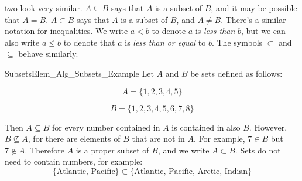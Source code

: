 \documentclass[crop=false,class=book,oneside]{standalone}
\begin{document}
            two look very similar. $A\subseteq{B}$ says that
            $A$ is a subset of $B$, and it may be possible that
            $A=B$. $A\subset{B}$ says that $A$ is a subset of $B$,
            and $A\ne{B}$.
            There's a similar notation for inequalities. We
            write $a<b$ to denote $a$ is \textit{less than} $b$,
            but we can also write $a\leq{b}$ to denote
            that $a$ is \textit{less than or equal} to $b$.
            The symbols $\subset$ and $\subseteq$
            behave similarly.
            \begin{fexample}{Subsets}{Elem_Alg_Subsets_Example}
                Let $A$ and $B$ be sets defined as follows:
                \par
                \begin{minipage}[b]{0.49\textwidth}
                    \begin{equation}
                        A=\{1,2,3,4,5\}
                    \end{equation}
                \end{minipage}
                \hfill
                \begin{minipage}[b]{0.49\textwidth}
                    \begin{equation}
                        B=\{1,2,3,4,5,6,7,8\}
                    \end{equation}
                \end{minipage}
                \par\hfill\par
                Then
                $A\subseteq{B}$ for every number
                contained in $A$ is contained in also
                $B$. However, $B\not\subseteq{A}$, for
                there are elements of $B$ that are not
                in $A$. For example, $7\in{B}$ but
                $7\notin{A}$. Therefore $A$ is a
                proper subset of $B$, and we write
                $A\subset{B}$. Sets do not need to
                contain numbers, for example:
                \begin{equation}
                    \{\textrm{Atlantic, Pacific}\}\subset
                    \{\textrm{Atlantic, Pacific, Arctic, Indian}\}
                \end{equation}
            \end{fexample}
\end{document}
